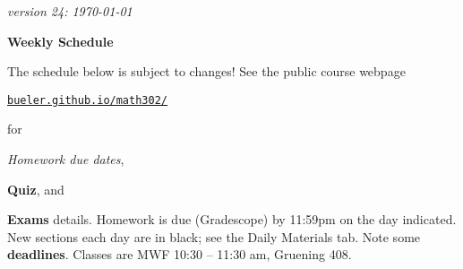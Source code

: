 \documentclass[12pt]{article}
\newcommand{\due}[1]{\strut {\color{BrickRed} \textsl{#1}}}
\newcommand{\ee}[1]{\strut {\color{Blue} \textbf{#1}}}
\newcommand{\dlinline}[1]{{\color{Purple} \textbf{#1}}}
\newcommand{\dl}[1]{{\small \dlinline{#1}}}
\begin{document}
\hfill \small \emph{version 24: \today} \normalsize

\bigskip\bigskip
\centerline{\Large \textbf{Weekly Schedule}}

\bigskip
The schedule below is subject to changes!  See the public course webpage

\medskip

\centerline{\href{https://bueler.github.io/math302/index.html}{\texttt{bueler.github.io/math302/}}}

\noindent for \due{Homework due dates}, \ee{Quiz}, and \ee{Exams} details.  Homework is due (Gradescope) by 11:59pm on the day indicated.  New sections each day are in black; see the Daily Materials tab.  Note some \dl{deadlines}.  Classes are MWF 10:30 -- 11:30 am, Gruening 408.

\bigskip
\end{document}

